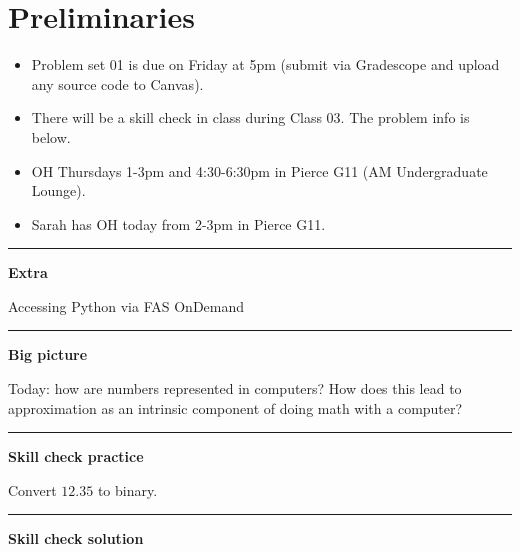 \documentclass[12pt,letterpaper,noanswers]{exam}
\begin{document}
 \pdfpageheight 11in 
  \pdfpagewidth 8.5in

\noindent 



\section{Preliminaries}
\begin{itemize}
\itemsep0pt
\item Problem set 01 is due on Friday at 5pm (submit via Gradescope and upload any source code to Canvas).
\item There will be a skill check in class during Class 03.  The problem info is below.
\item OH Thursdays 1-3pm and 4:30-6:30pm in Pierce G11 (AM Undergraduate Lounge).
\item Sarah has OH today from 2-3pm in Pierce G11.
\end{itemize}

\hrule
\vspace{0.2cm}
\noindent\textbf{Extra}

Accessing Python via FAS OnDemand

\vspace{0.2cm}
\hrule
\vspace{0.2cm}



\noindent\textbf{Big picture}

Today: how are numbers represented in computers?  How does this lead to approximation as an intrinsic component of doing math with a computer?

\vspace{0.2cm}
\hrule
\vspace{0.2cm}

\noindent \textbf{Skill check practice}

Convert $12.35$ to binary.


\vspace{0.2cm}
\hrule
\vspace{0.2cm}

\noindent \textbf{Skill check solution}
\end{document}
